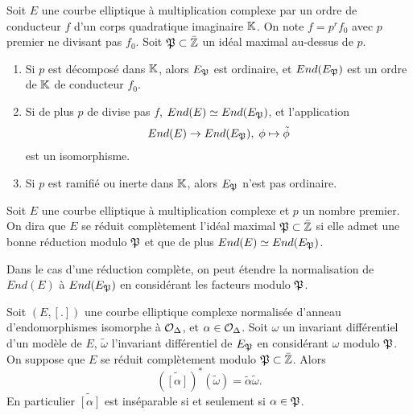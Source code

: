 \begin{The}\label{CritèreReductionComplete}
	
	Soit $E$ une courbe elliptique à multiplication complexe par un ordre de conducteur $f$ d'un corps quadratique imaginaire $\mathbb{K}$. On note $f = p^r f_{0}$ avec $p$ premier ne divisant pas $f_{0}$. Soit $\mathfrak{P}\subset\bar{\mathbb{Z}}$ un idéal maximal au-dessus de $p$.
	\begin{enumerate}
		\item Si $p$ est décomposé dans $\mathbb{K}$, alors $E_{\mathfrak{P}}$ est ordinaire, et $End(E_{\mathfrak{P}})$ est un ordre de $\mathbb{K}$ de conducteur $f_{0}$.
		\item Si de plus $p$ de divise pas $f$, $End(E)\simeq End(E_{\mathfrak{P}})$, et l'application 
		\begin{equation*}
			End(E)\rightarrow End(E_{\mathfrak{P}}),\;\phi\mapsto\tilde{\phi}
		\end{equation*} est un isomorphisme.
		\item Si $p$ est ramifié ou inerte dans $\mathbb{K}$, alors $E_{\mathfrak{P}}$ n'est pas ordinaire.
	\end{enumerate}
	
\end{The}


\begin{Def}
	Soit $E$ une courbe elliptique à multiplication complexe et $p$ un nombre premier. On dira que $E$ se réduit complètement l'idéal maximal $\mathfrak{P}\subset\bar{\mathbb{Z}}$ si elle admet une bonne réduction modulo $\mathfrak{P}$ et que de plus $End(E)\simeq End(E_{\mathfrak{P}})$.
\end{Def}

Dans le cas d'une réduction complète, on peut étendre la normalisation de $End(E)$ à $End(E_{\mathfrak{P}})$ en considérant les facteurs modulo $\mathfrak{P}$.

\begin{Prop}\label{facteurEndomorphismeReduction}
	
	Soit $(E,[.])$ une courbe elliptique complexe normalisée d'anneau d'endomorphismes isomorphe à $\mathcal{O}_{\Delta}$, et $\alpha\in\mathcal{O}_{\Delta}$. Soit $\omega$ un invariant différentiel d'un modèle de $E$, $\tilde{\omega}$ l'invariant différentiel de $E_{\mathfrak{P}}$ en considérant $\omega$ modulo $\mathfrak{P}$. On suppose que $E$ se réduit complètement modulo $\mathfrak{P}\subset\bar{\mathbb{Z}}$. Alors 
	\begin{equation*}
		\left( \widetilde{\left[\alpha\right] }\right)^{*}\left( \tilde{\omega}\right) = \tilde{\alpha}\tilde{\omega}.
	\end{equation*}
	En particulier $\widetilde{[\alpha]}$ est inséparable si et seulement si $\alpha\in\mathfrak{P}$.
\end{Prop}

